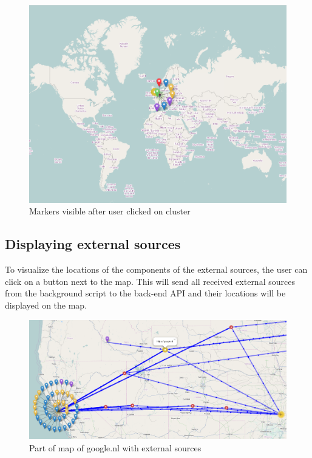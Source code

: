 \documentclass[twoside,openright,notitlepage]{uva-bachelor-thesis}
\begin{document}
\begin{figure}[h!]
    \centering
    \includegraphics[width=1.0\textwidth, center]{img/cluster_open.PNG}
    \caption{Markers visible after user clicked on cluster}
    \label{fig:cluster_open}
\end{figure}

\FloatBarrier
\subsection{Displaying external sources}
To visualize the locations of the components of the external sources, the user can click on a button next to the map. This will send all received external sources from the background script to the back-end API and their locations will be displayed on the map.

\begin{figure}[h!]
    \centering
    \includegraphics[width=1.0\textwidth, center]{img/google.PNG}
    \caption{Part of map of google.nl with external sources}
    \label{fig:google}
\end{figure}
\end{document}
